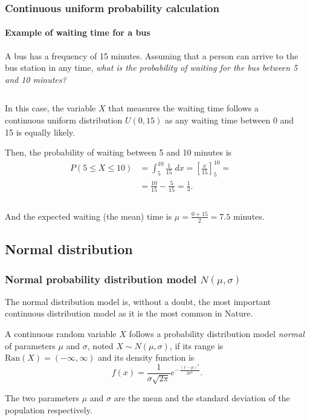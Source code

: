 \begin{frame}
\frametitle{Continuous uniform probability calculation}
\framesubtitle{Example of waiting time for a bus}
A bus has a frequency of 15 minutes. 
Assuming that a person can arrive to the bus station in any time, \emph{what is the probability of waiting for the bus between 5 and 10 minutes?}
\begin{columns}
\begin{column}{0.52\textwidth}
In this case, the variable $X$ that measures the waiting time follows a continuous uniform distribution $U(0,15)$ as any waiting time between 0 and 15 is equally likely. 

Then, the probability of waiting between 5 and 10 minutes is
\begin{align*}
P(5\leq X\leq 10) &= \int_{5}^{10} \frac{1}{15}\;dx = \left[\frac{x}{15}\right]_5^{10} = \\
&= \frac{10}{15}-\frac{5}{15} =\frac{1}{3}.
\end{align*}
\end{column}
\begin{column}{0.43\textwidth}
\begin{center}
\end{center}
\end{column}
\end{columns}
And the expected waiting (the mean) time is $\mu=\frac{0+15}{2}=7.5$ minutes.
\end{frame}


\subsection{Normal distribution}

\begin{frame}
\frametitle{Normal probability distribution model $N(\mu,\sigma)$}
The normal distribution model is, without a doubt, the most important continuous distribution model as it is the most common in Nature.

\begin{definition}
A continuous random variable $X$ follows a probability distribution model \emph{normal} of parameters $\mu$ and
$\sigma$, noted $X\sim N(\mu,\sigma)$, if its range is $\mbox{Ran}(X) = (-\infty,\infty)$ and its density function is
\[
f(x)= \frac{1}{\sigma\sqrt{2\pi}}e^{-\frac{(x-\mu)^2}{2\sigma^2}}.
\]
\end{definition}

The two parameters $\mu$ and $\sigma$ are the mean and the standard deviation of the population respectively. 
\end{frame}


